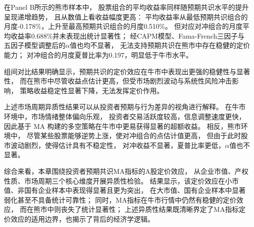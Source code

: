 在Panel B所示的熊市样本中，
股票组合的平均收益率同样随预期共识水平的提升呈现递增趋势，
且从数值上看收益幅度更高：
平均收益率从最低预期共识组合的月度-0.178\%，上升至最高预期共识组合的月度0.510\%。
但对应对冲组合的月度平均收益率0.688\%并未表现出统计显著性；
经CAPM模型、Fama-French三因子与五因子模型调整后的$\alpha$值也均不显著，
无法支持预期共识在熊市中存在稳健的定价能力；
对冲组合的月度夏普比率为0.197，明显低于牛市水平。

组间对比结果明确显示，预期共识的定价效应在牛市中表现出更强的稳健性与显著性，
而在熊市中尽管收益点估计更高，但受市场剧烈波动与系统性风险冲击影响，
策略收益稳定性显著下降，无法发挥定价作用。

 \FloatBarrier

上述市场周期异质性结果可以从投资者预期与行为差异的视角进行解释。
在牛市环境中，市场情绪整体偏向乐观，
投资者交易活跃度较高，信息调整速度更快，
因此基于 MA 构建的多空策略在牛市中更易获得显著的超额收益。
相反，熊市环境中，
尽管某些股票能够逆势上涨，使对冲组合的点估计值更高，
但由于此时股市波动剧烈，使得估计具有不稳定性，
对冲收益不显著，夏普比率更低，$\alpha$值也不显著。

综合来看，本章围绕投资者预期共识MA指标的A股定价效应，
从企业市值、产权性质、市场周期三个核心维度开展异质性检验。
结果显示，该定价效应在小市值、非国有企业样本中表现得显著且更为突出，
在大市值、国有企业样本中显著弱化甚至不具备统计可靠性；
同时，MA指标在牛市行情中仍然有稳健的定价效应，
而在熊市中则丧失了统计显著性；
上述异质性结果既清晰界定了MA指标定价效应的适用边界，也揭示了背后的经济学逻辑。

